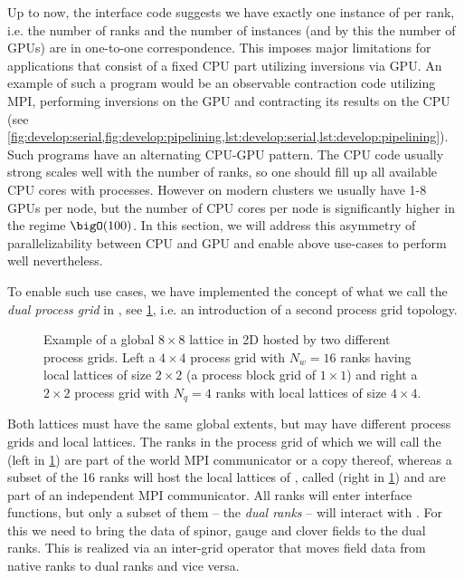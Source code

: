 
Up to now, the interface code suggests we have exactly one instance of \quda per rank, i.e. the number of ranks and the number of \quda instances (and by this the number of GPUs) are in one-to-one correspondence.
This imposes major limitations for applications that consist of a fixed CPU part utilizing inversions via GPU.
An example of such a program would be an observable contraction code utilizing MPI, performing inversions on the GPU and contracting its results on the CPU (see \cref{fig:develop:serial,fig:develop:pipelining,lst:develop:serial,lst:develop:pipelining}).
Such programs have an alternating CPU-GPU pattern.
The CPU code usually strong scales well with the number of ranks, so one should fill up all available CPU cores with processes.
However on modern clusters we usually have 1-8 GPUs per node, but the number of CPU cores per node is significantly higher in the regime $\bigO(100)$.
In this section, we will address this asymmetry of parallelizability between CPU and GPU and enable above use-cases to perform well nevertheless.

To enable such use cases, we have implemented the concept of what we call the \emph{dual process grid} in \openqxd, see \cref{fig:interface:dual_naive}, i.e. an introduction of a second process grid topology.
\begin{figure}
  
  \caption{Example of a global $8 \times 8$ lattice in 2D hosted by two different process grids. Left a $4 \times 4$ process grid with $N_w = 16$ ranks having local lattices of size $2 \times 2$ (a process block grid of $1 \times 1$) and right a $2 \times 2$ process grid with $N_q = 4$ ranks with local lattices of size $4 \times 4$.}
  \label{fig:interface:dual_naive}
\end{figure}
Both lattices must have the same global extents, but may have different process grids and local lattices.
The ranks in the process grid of \openqxd which we will call the  (left in \cref{fig:interface:dual_naive}) are part of the world MPI communicator  or a copy thereof, whereas a subset of the \num{16} ranks will host the local lattices of \quda, called  (right in \cref{fig:interface:dual_naive}) and are part of an independent MPI communicator.
All ranks will enter interface functions, but only a subset of them -- the \emph{dual ranks} -- will interact with \quda.
For this we need to bring the data of spinor, gauge and clover fields to the dual ranks.
This is realized via an inter-grid operator that moves field data from native ranks to dual ranks and vice versa.

